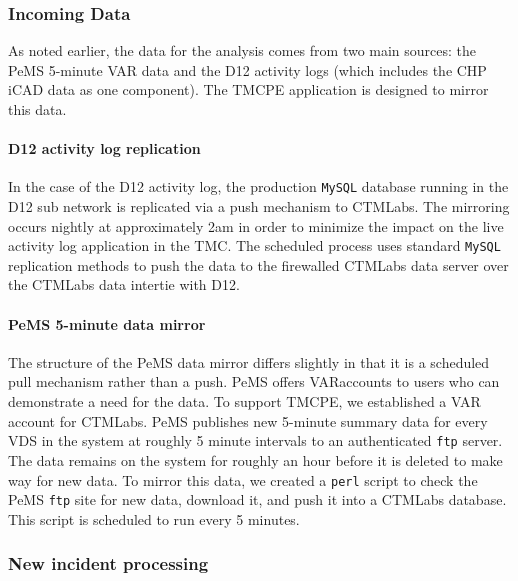 \documentclass[12pt]{report}
\begin{document}
\subsubsection{Incoming Data}
\label{sec:incoming-data}

As noted earlier, the data for the analysis comes from two main sources: the
\ac{PeMS} 5-minute \ac{VAR} data and the \ac{D12} activity logs (which includes
the \ac{CHP} \ac{iCAD} data as one component).  The \ac{TMCPE} application is
designed to mirror this data.  

\paragraph{D12 activity log replication}

In the case of the \ac{D12} activity log, the production \texttt{MySQL} database
running in the \ac{D12} sub network is replicated via a push mechanism to
\ac{CTMLabs}.  The mirroring occurs nightly at approximately 2am in order to
minimize the impact on the live activity log application in the \ac{TMC}.  The
scheduled process uses standard \texttt{MySQL} replication methods to push the
data to the firewalled \ac{CTMLabs} data server over the \ac{CTMLabs} data
intertie with \ac{D12}.

\paragraph{PeMS 5-minute data mirror}

The structure of the \ac{PeMS} data mirror differs slightly in that it is a
scheduled pull mechanism rather than a push.  \ac{PeMS} offers \acf{VAR}accounts
to users who can demonstrate a need for the data.  To support \ac{TMCPE}, we
established a \ac{VAR} account for \ac{CTMLabs}.  \ac{PeMS} publishes new
5-minute summary data for every \ac{VDS} in the system at roughly 5 minute
intervals to an authenticated \texttt{ftp} server.  The data remains on the
system for roughly an hour before it is deleted to make way for new data.  To
mirror this data, we created a \texttt{perl} script to check the \ac{PeMS}
\texttt{ftp} site for new data, download it, and push it into a \ac{CTMLabs}
database.  This script is scheduled to run every 5 minutes.


\subsubsection{New incident processing}
\label{sec:incident-processing}
\end{document}
